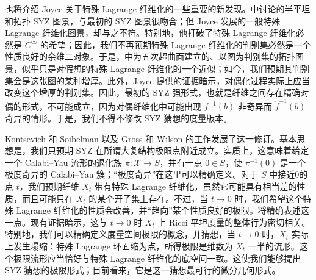 也将介绍 Joyce 关于特殊 Lagrange 纤维化的一些重要的新发现。中讨论的半平坦和拓扑 SYZ 图景，与最初的 SYZ 图景很吻合；但 Joyce 发展的一般特殊 Lagrange 纤维化图景，却与之不符。特别地，他打破了特殊 Lagrange 纤维化必然是 $C^\infty$ 的希望；因此，我们不再预期特殊 Lagrange 纤维化的判别集必然是一个性质良好的余维二对象。于是，中为五次超曲面建立的、以图为判别集的拓扑图景，似乎只是对假想的特殊 Lagrange 纤维化的一个近似；如今，我们预期其判别集会是这张图的某种增厚。此外，Joyce 提供的证据暗示，对偶化过程实际上应当改变这个增厚的判别集。因此，最初的 SYZ 强形式，也就是纤维之间存在精确对偶的形式，不可能成立，因为对偶纤维化中可能出现 $f^{-1}(b)$ 非奇异而 $\check{f}^{-1}(b)$ 奇异的情形。于是，我们不得不修改 SYZ 猜想的度量版本。

Kontsevich 和 Soibelman 以及 Gross 和 Wilson 的工作发展了这一修订。基本思想是，我们只预期 SYZ 在所谓大复结构极限点附近成立。实质上，这意味着给定一个 Calabi--Yau 流形的退化族 $\pi\colon\mathcal{X}\to S$，并有一点 $0\in S$，使 $\pi^{-1}(0)$ 是一个极度奇异的 Calabi--Yau 簇；“极度奇异”在这里可以精确定义。对于 $S$ 中接近0的点 $t$，我们预期纤维 $X_t$ 带有特殊 Lagrange 纤维化，虽然它可能具有相当差的性质，而且可能只在 $X_t$ 的某个开子集上存在。不过，当 $t\to0$ 时，我们希望这个特殊 Lagrange 纤维化的性质会改善，并“趋向”某个性质良好的极限。将精确表述这一点。现有证据暗示，这与 $t\to0$ 时 $X_t$ 上 Ricci 平坦度量的整体行为密切相关。特别地，我们可以精确定义度量空间极限的概念，并猜想，当 $t\to0$ 时，$X_t$ 实际上发生塌缩：特殊 Lagrange 环面缩为点，所得极限是维数为 $X_t$ 一半的流形。这个极限流形应当恰好与特殊 Lagrange 纤维化的底空间一致。这使我们能够提出 SYZ 猜想的极限形式；目前看来，它是这一猜想最可行的微分几何形式。
